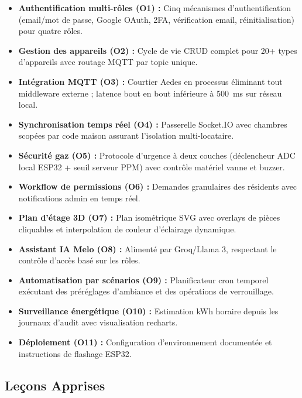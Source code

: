 \begin{itemize}[leftmargin=1.5cm,itemsep=6pt]
  \item \textbf{Authentification multi-rôles (O1) :} Cinq mécanismes d'authentification
        (email/mot de passe, Google OAuth, 2FA, vérification email, réinitialisation)
        pour quatre rôles.
  \item \textbf{Gestion des appareils (O2) :} Cycle de vie CRUD complet pour 20+ types
        d'appareils avec routage MQTT par topic unique.
  \item \textbf{Intégration MQTT (O3) :} Courtier Aedes en processus éliminant tout
        middleware externe ; latence bout en bout inférieure à 500~ms sur réseau local.
  \item \textbf{Synchronisation temps réel (O4) :} Passerelle Socket.IO avec chambres
        scopées par code maison assurant l'isolation multi-locataire.
  \item \textbf{Sécurité gaz (O5) :} Protocole d'urgence à deux couches (déclencheur ADC
        local ESP32 + seuil serveur PPM) avec contrôle matériel vanne et buzzer.
  \item \textbf{Workflow de permissions (O6) :} Demandes granulaires des résidents avec
        notifications admin en temps réel.
  \item \textbf{Plan d'étage 3D (O7) :} Plan isométrique SVG avec overlays de pièces
        cliquables et interpolation de couleur d'éclairage dynamique.
  \item \textbf{Assistant IA Melo (O8) :} Alimenté par Groq/Llama 3, respectant le
        contrôle d'accès basé sur les rôles.
  \item \textbf{Automatisation par scénarios (O9) :} Planificateur cron temporel exécutant
        des préréglages d'ambiance et des opérations de verrouillage.
  \item \textbf{Surveillance énergétique (O10) :} Estimation kWh horaire depuis les
        journaux d'audit avec visualisation recharts.
  \item \textbf{Déploiement (O11) :} Configuration d'environnement documentée et
        instructions de flashage ESP32.
\end{itemize}

\subsection{Leçons Apprises}

